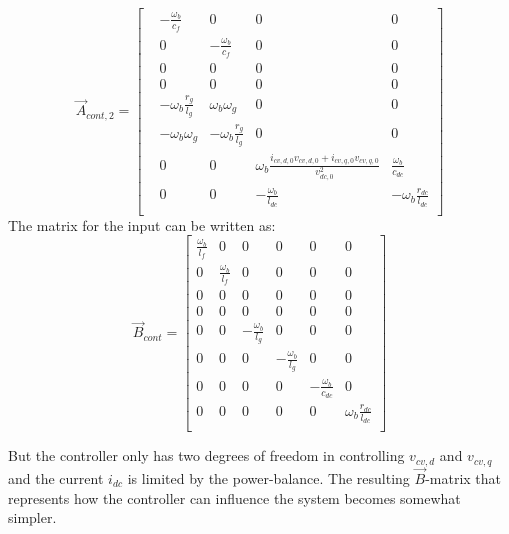 \begin{equation}
 \Vec{A}_{cont,2}=
 \begin{bmatrix}

& -\frac{\omega_b}{c_f} & 0 & 0 & 0\\
& 0 & -\frac{\omega_b}{c_f} & 0 & 0 \\
& 0 & 0 & 0 & 0\\
& 0 & 0 & 0 & 0 \\
& -\omega_b\frac{r_g}{l_g} & \omega_b \omega_g & 0 & 0\\
& -\omega_b \omega_g & -\omega_b\frac{r_g}{l_g} & 0 & 0\\
&0 &0 & \omega_b \frac{i_{cv,d,0}v_{cv,d,0} + i_{cv,q,0}v_{cv,q,0} }{v_{dc,0}^2} &\frac{\omega_b}{c_{dc}} \\
&0 &0 &- \frac{\omega_b}{l_{dc}} & - \omega_b \frac{r_{dc}}{l_{dc}} \\
 
\end{bmatrix}{}
\end{equation}{}
The matrix for the input can be written as: 
\begin{equation}
 \Vec{B}_{cont} = 
 \begin{bmatrix}
 \frac{\omega_b}{l_f} & 0&0&0&0&0\\
 0 & \frac{\omega_b}{l_f}&0&0&0&0\\
 0 &0 &0&0&0&0\\
 0 &0 &0&0&0&0\\
 0 &0 &-\frac{\omega_b}{l_g} & 0&0&0\\
 0 &0 &0&-\frac{\omega_b}{l_g}&0&0\\
 0 &0 &0&0& -\frac{\omega_b}{c_{dc}} & 0\\
 0 &0 &0&0& 0 & \omega_b \frac{r_{dc}}{l_{dc}}\\
 
 
 \end{bmatrix}{}
\end{equation}{}{}

But the controller only has two degrees of freedom in controlling $v_{cv,d}$ and $v_{cv,q}$ and the current $i_{dc}$ is limited by the power-balance. The resulting $\Vec{B}$-matrix that represents how the controller can influence the system becomes somewhat simpler. 

